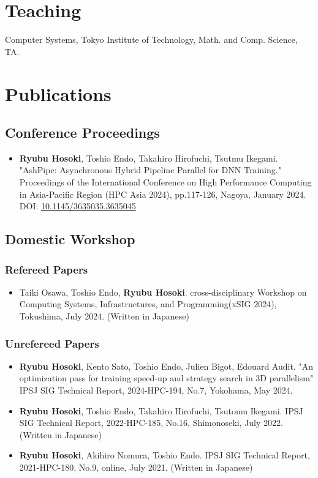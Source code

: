 \documentclass[10pt]{article}
\begin{document}
\section{Teaching}
\begin{description}[align=left,leftmargin=1.2cm,style=multiline]
  \item[2023] Computer Systems, Tokyo Institute of Technology, Math. and Comp. Science, TA.
\end{description}


\section{Publications}
\subsection{Conference Proceedings}
\begin{itemize}[align=left,leftmargin=0.5cm,style=multiline]
  \item {\bf Ryubu Hosoki}, Toshio Endo, Takahiro Hirofuchi, Tsutmu Ikegami. "AshPipe: Asynchronous Hybrid Pipeline Parallel for DNN Training." Proceedings of the International Conference on High Performance Computing in Asia-Pacific Region (HPC Asia 2024), pp.117-126, Nagoya, January 2024. {\small DOI: \href{https://dl.acm.org/doi/10.1145/3635035.3635045}{10.1145/3635035.3635045}}
\end{itemize}

\subsection{Domestic Workshop}
\subsubsection{Refereed Papers}
\begin{itemize}[align=left,leftmargin=0.5cm,style=multiline]
  \item Taiki Osawa, Toshio Endo, {\bf Ryubu Hosoki}. cross-disciplinary Workshop on Computing Systems, Infrastructures, and Programming(xSIG 2024),
  Tokushima, July 2024. (Written in Japanese)
\end{itemize}


\subsubsection{Unrefereed Papers}
\begin{itemize}[align=left,leftmargin=0.5cm,style=multiline]
  \item {\bf Ryubu Hosoki}, Kento Sato, Toshio Endo, Julien Bigot, Edouard Audit. "An optimization pass for training speed-up and strategy search in 3D parallelism" IPSJ SIG Technical Report, 2024-HPC-194, No.7, Yokohama, May 2024.
  \item {\bf Ryubu Hosoki}, Toshio Endo, Takahiro Hirofuchi, Tsutomu Ikegami. IPSJ SIG Technical Report, 2022-HPC-185, No.16, Shimonoseki, July 2022. (Written in Japanese)
  \item {\bf Ryubu Hosoki}, Akihiro Nomura, Toshio Endo. IPSJ SIG Technical Report, 2021-HPC-180, No.9, online, July 2021. (Written in Japanese)
\end{itemize}
\end{document}
